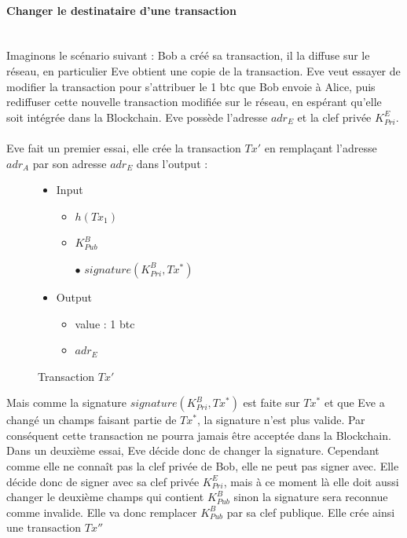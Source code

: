 \documentclass[11pt,a4paper]{article}
\begin{document}
\paragraph{Changer le destinataire d'une transaction\\\\}

Imaginons le scénario suivant : Bob a créé sa transaction, il la diffuse sur le réseau, en particulier Eve obtient une copie de la transaction. Eve veut essayer de modifier la transaction pour s'attribuer le 1 btc que Bob envoie à Alice, puis rediffuser cette nouvelle transaction modifiée sur le réseau, en espérant qu'elle soit intégrée dans la Blockchain. Eve possède l'adresse $adr_E$ et la clef privée 
$K^E_{Pri}$.\\\\
Eve fait un premier essai, elle crée la transaction $Tx'$ en remplaçant l'adresse $adr_A$ par son adresse $adr_E$ dans l'output :

\begin{figure}[H]
\begin{itemize}
\renewcommand{\labelitemi}{$\bullet$}
\renewcommand{\labelitemii}{$\star$}

\item Input
\begin{itemize}
\item $h(Tx_1)$
\item $K_{Pub}^{B}$
\item[$\bullet$] $signature(K_{Pri}^{B}, Tx^*)$
\end{itemize}

\item Output
\begin{itemize}
\item value : 1 btc
\item $adr_E$
\end{itemize}

\end{itemize}

\caption{Transaction $Tx'$}
\end{figure}

Mais comme la signature $signature(K_{Pri}^{B}, Tx^*)$ est faite sur $Tx^*$ et que Eve a changé un champs faisant partie de $Tx^*$, la signature n'est plus valide. Par conséquent cette transaction ne pourra jamais être acceptée dans la Blockchain. Dans un deuxième essai, Eve décide donc de changer la signature. Cependant comme elle ne connaît pas la clef privée de Bob, elle ne peut pas signer avec. Elle décide donc de signer avec sa clef privée $K^E_{Pri}$, mais à ce moment là elle doit aussi changer le deuxième champs qui contient $K^B_{Pub}$ sinon la signature sera reconnue comme invalide. Elle va donc remplacer $K^B_{Pub}$ par sa clef publique. Elle crée ainsi une transaction $Tx''$
\end{document}
